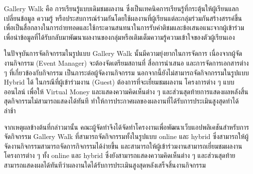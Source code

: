 \maketitle
\makesignature

\ifproject
    \begin{abstractTH}

        Gallery Walk คือ การเรียนรู้แบบเดิมชมผลงาน ซึ่งเป็นเทคนิคการเรียนรู้ที่กระตุ้นให้ผู้เรียนแลกเปลี่ยนข้อมูล ความรู้ หรือประสบการณ์ร่วมกันโดยใช้ผลงานที่ผู้เรียนแต่ละกลุ่มร่วมกันสร้างสรรค์ขึ้นเพื่อเป็นสื่อกลางในการถ่ายทอดและใช้กระดานสนทนาในการรับคำติชมและข้อเสนอแนะจากผู้เข้าร่วม เพื่อนำข้อมูลที่ได้รับกลับมาพัฒนาผลงานของกลุ่มหรือเติมเต็มความรู้ความเข้าใจของตัวผู้เรียนเอง

        ในปัจจุบันการจัดกิจกรรมในรูปแบบ Gallery Walk นั้นมีความยุ่งยากในการจัดการ เนื่องจากผู้จัดงานกิจกรรม (Event Manager) จะต้องจัดเตรียมสถานที่ สื่อการนำเสนอ และการจัดการเอกสารต่าง ๆ ที่เกี่ยวข้องกับกิจกรรม เป็นภาระต่อผู้จัดงานกิจกรรม นอกจากนี้ยังไม่สามารถจัดกิจกกรรมในรูปแบบ Hybrid ได้ ในกรณีที่ผู้เข้าร่วมงาน (Guest) ต้องการที่จะเยี่ยมชมผลงาน โครงการต่าง ๆ แบบออนไลน์ เพื่อให้ Virtual Money และแสดงความคิดเห็นต่าง ๆ และส่วนสุดท้ายการแสดงผลหลังสิ้นสุดกิจกรรมไม่สามารถแสดงได้ทันที ทำให้การประกาศผลของผลงานที่ได้รับการประเมินสูงสุดทำได้ล่าช้า

        จากเหตุผลข้างต้นที่กล่าวมานั้น คณะผู้จัดทำจึงได้จัดทำโครงงานเพื่อพัฒนาเว็บแอปพลิเคชันสำหรับการจัดกิจกรรม Gallery Walk ที่สามารถจัดกิจกรรมทั้งในรูปแบบ online และ hybrid ซึ่งสามารถให้ผู้จัดงานกิจกรรมสามารถจัดการกิจกรรมได้ง่ายขึ้น และสามารถให้ผู้เข้าร่วมงานสามารถเยี่ยมชมผลงาน โครงการต่าง ๆ ทั้ง online และ hybrid ซึ่งยังสามารถแสดงความคิดเห็นต่าง ๆ และส่วนสุดท้ายสามารถแสดงผลได้ทันทีว่าผลงานใดได้รับการประเมินสูงสุดหลังเสร็จสิ้นงานกิจกรรม
    \end{abstractTH}

